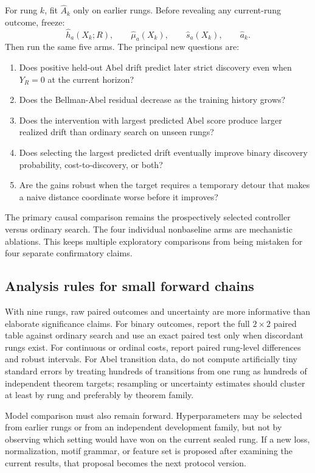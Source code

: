 For rung $k$, fit $\widehat A_k$ only on earlier rungs. Before revealing any current-rung outcome, freeze:
\[
\widehat h_a(X_k;R),\qquad
\widehat\mu_a(X_k),\qquad
\widehat s_a(X_k),\qquad
\widehat a_k.
\]
Then run the same five arms. The principal new questions are:
\begin{enumerate}[label=(\alph*)]
\item Does positive held-out Abel drift predict later strict discovery even when $Y_R=0$ at the current horizon?
\item Does the Bellman-Abel residual decrease as the training history grows?
\item Does the intervention with largest predicted Abel score produce larger realized drift than ordinary search on unseen rungs?
\item Does selecting the largest predicted drift eventually improve binary discovery probability, cost-to-discovery, or both?
\item Are the gains robust when the target requires a temporary detour that makes a naive distance coordinate worse before it improves?
\end{enumerate}

The primary causal comparison remains the prospectively selected controller versus ordinary search. The four individual nonbaseline arms are mechanistic ablations. This keeps multiple exploratory comparisons from being mistaken for four separate confirmatory claims.

\subsection{Analysis rules for small forward chains}
With nine rungs, raw paired outcomes and uncertainty are more informative than elaborate significance claims. For binary outcomes, report the full $2\times2$ paired table against ordinary search and use an exact paired test only when discordant rungs exist. For continuous or ordinal costs, report paired rung-level differences and robust intervals. For Abel transition data, do not compute artificially tiny standard errors by treating hundreds of transitions from one rung as hundreds of independent theorem targets; resampling or uncertainty estimates should cluster at least by rung and preferably by theorem family.

Model comparison must also remain forward. Hyperparameters may be selected from earlier rungs or from an independent development family, but not by observing which setting would have won on the current sealed rung. If a new loss, normalization, motif grammar, or feature set is proposed after examining the current results, that proposal becomes the next protocol version.

